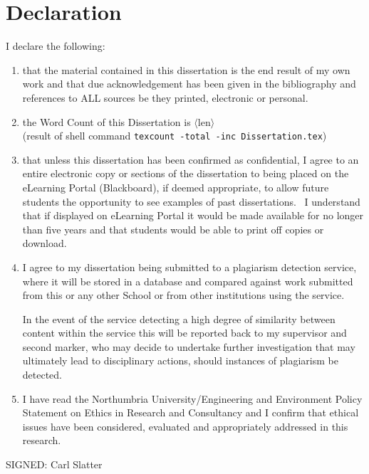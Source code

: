 
\chapter{Declaration}

I declare the following:

\begin{enumerate}

\item that the material contained in this dissertation is the end result of my own work and that due acknowledgement has been given in the bibliography and references to ALL sources be they printed, electronic or personal.

\item the Word Count of this Dissertation is $\langle\mathrm{len}\rangle$\\
(result of shell command \texttt{texcount -total -inc Dissertation.tex})

\item that unless this dissertation has been confirmed as confidential, I agree to an entire electronic copy or sections of the dissertation to being placed on the eLearning Portal (Blackboard), if deemed appropriate, to allow future students the opportunity to see examples of past dissertations.  I understand that if displayed on eLearning Portal it would be made available for no longer than five years and that students would be able to print off copies or download. 

\item I agree to my dissertation being submitted to a plagiarism detection service, where it will be stored in a database and compared against work submitted from this or any other School or from other institutions using the service. 

In the event of the service detecting a high degree of similarity between content within the service this will be reported back to my supervisor and second marker, who may decide to undertake further investigation that may ultimately lead to disciplinary actions, should instances of plagiarism be detected.

\item I have read the Northumbria University/Engineering and Environment Policy Statement on Ethics in Research and Consultancy and I confirm that ethical issues have been considered, evaluated and appropriately addressed in this research.
\end{enumerate}
\vspace{1in}
\large{SIGNED: Carl Slatter\dotfill}
